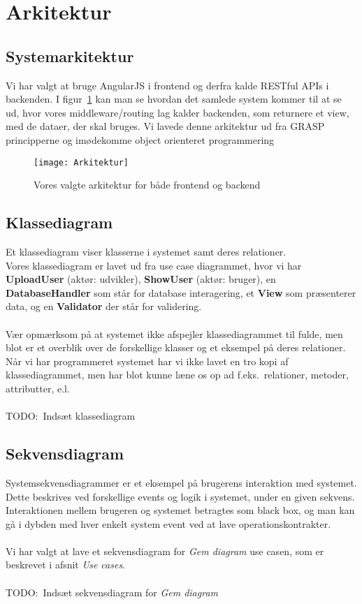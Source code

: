 \section{Arkitektur}
\subsection{Systemarkitektur}
Vi har valgt at bruge AngularJS i frontend og derfra kalde RESTful APIs i backenden. I figur~\ref{fig:arkitektur}
kan man se hvordan det samlede system kommer til at se ud, hvor vores middleware/routing lag kalder backenden,
som returnere et view, med de dataer, der skal bruges.
Vi lavede denne arkitektur ud fra GRASP principperne og imødekomme object orienteret programmering
\begin{figure}[here]
\texttt{[image: Arkitektur]}
\caption{Vores valgte arkitektur for både frontend og backend}
\label{fig:arkitektur}
\end{figure}

\subsection{Klassediagram}
Et klassediagram viser klasserne i systemet samt deres relationer.\\
Vores klassediagram er lavet ud fra use case diagrammet, hvor vi har \textbf{UploadUser} (aktør: udvikler), \textbf{ShowUser} (aktør: bruger), en \textbf{DatabaseHandler} som står for database interagering, et \textbf{View} som præsenterer data, og en \textbf{Validator} der står for validering.
\\\\
Vær opmærksom på at systemet ikke afspejler klassediagrammet til fulde, men blot er et overblik over de forskellige klasser og et eksempel på deres relationer.
Når vi har programmeret systemet har vi ikke lavet en tro kopi af klassediagrammet, men har blot kunne læne os op ad f.eks.\
relationer, metoder, attributter, e.l.
\\\\
TODO:\ Indsæt klassediagram
\subsection{Sekvensdiagram}
Systemsekvensdiagrammer er et eksempel på brugerens interaktion med systemet. Dette beskrives ved forskellige events og logik i systemet, under en given sekvens.
\\
Interaktionen mellem brugeren og systemet betragtes som black box, og man kan gå i dybden med hver enkelt system event ved at lave operationskontrakter.
\\\\
Vi har valgt at lave et sekvensdiagram for \textit{Gem diagram} use casen, som er beskrevet i afsnit \textit{Use cases}.
\\\\
TODO:\ Indsæt sekvensdiagram for \textit{Gem diagram}
